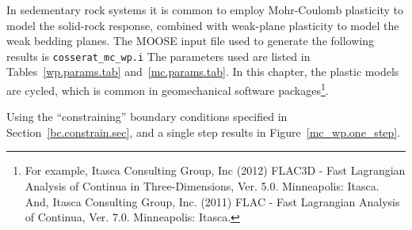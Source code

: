 \documentclass[]{scrreprt}
\begin{document}
In sedementary rock systems it is common to employ Mohr-Coulomb
plasticity to model the solid-rock response, combined with weak-plane
plasticity to model the weak bedding planes.  The MOOSE input file
used to generate the following results is {\tt cosserat\_mc\_wp.i} The
parameters used are listed in Tables~\ref{wp.params.tab}
and~\ref{mc.params.tab}.  In this chapter, the plastic models are
cycled, which is common in geomechanical software
packages\footnote{For example, Itasca Consulting Group, Inc (2012)
  FLAC3D - Fast Lagrangian Analysis of Continua in Three-Dimensions,
  Ver. 5.0.  Minneapolis: Itasca.  And, Itasca Consulting Group,
  Inc. (2011) FLAC - Fast Lagrangian Analysis of Continua, Ver. 7.0.
  Minneapolis: Itasca.}.

Using the ``constraining'' boundary conditions specified in
Section~\ref{bc.constrain.sec}, and a single step results in
Figure~\ref{mc_wp.one_step}.
\end{document}
